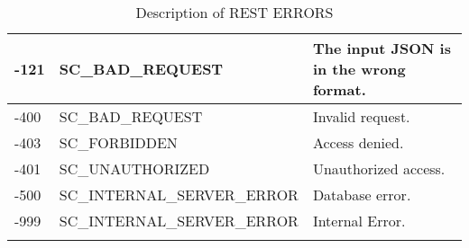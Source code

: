 \begin{longtable}{|p{}|p{} |p{}|}
        -121 & SC\_BAD\_REQUEST & The input JSON is in the wrong format. \\\hline
        -400 & SC\_BAD\_REQUEST & Invalid request. \\\hline
        -403 & SC\_FORBIDDEN & Access denied. \\\hline
        -401 & SC\_UNAUTHORIZED & Unauthorized access. \\\hline
        -500 & SC\_INTERNAL\_SERVER\_ERROR & Database error. \\\hline
        -999 & SC\_INTERNAL\_SERVER\_ERROR & Internal Error. \\\hline
\caption{Description of REST ERRORS}
\label{tab:termGlossary}
\end{longtable}